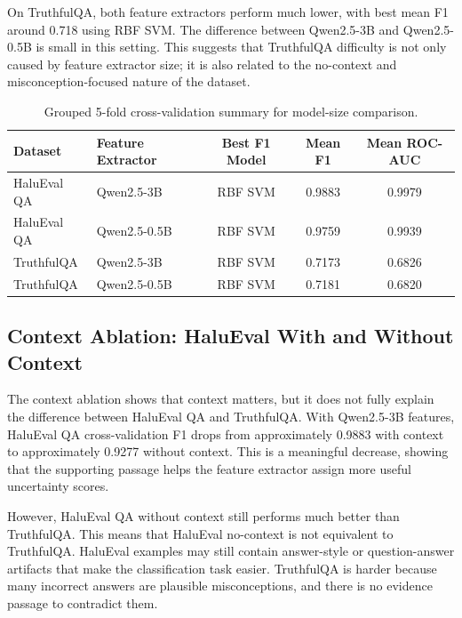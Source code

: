 \documentclass[11pt]{article}
\begin{document}
On TruthfulQA, both feature extractors perform much lower, with best mean F1 around 0.718 using RBF SVM. The difference between Qwen2.5-3B and Qwen2.5-0.5B is small in this setting. This suggests that TruthfulQA difficulty is not only caused by feature extractor size; it is also related to the no-context and misconception-focused nature of the dataset.

\begin{table}[H]
    \centering
    \small
    \begin{tabular}{llccc}
        \toprule
        Dataset & Feature Extractor & Best F1 Model & Mean F1 & Mean ROC-AUC \\
        \midrule
        HaluEval QA & Qwen2.5-3B & RBF SVM & 0.9883 & 0.9979 \\
        HaluEval QA & Qwen2.5-0.5B & RBF SVM & 0.9759 & 0.9939 \\
        TruthfulQA & Qwen2.5-3B & RBF SVM & 0.7173 & 0.6826 \\
        TruthfulQA & Qwen2.5-0.5B & RBF SVM & 0.7181 & 0.6820 \\
        \bottomrule
    \end{tabular}
    \caption{Grouped 5-fold cross-validation summary for model-size comparison.}
    \label{tab:cv-summary-results}
\end{table}

\subsection{Context Ablation: HaluEval With and Without Context}
The context ablation shows that context matters, but it does not fully explain the difference between HaluEval QA and TruthfulQA. With Qwen2.5-3B features, HaluEval QA cross-validation F1 drops from approximately 0.9883 with context to approximately 0.9277 without context. This is a meaningful decrease, showing that the supporting passage helps the feature extractor assign more useful uncertainty scores.

However, HaluEval QA without context still performs much better than TruthfulQA. This means that HaluEval no-context is not equivalent to TruthfulQA. HaluEval examples may still contain answer-style or question-answer artifacts that make the classification task easier. TruthfulQA is harder because many incorrect answers are plausible misconceptions, and there is no evidence passage to contradict them.
\end{document}
